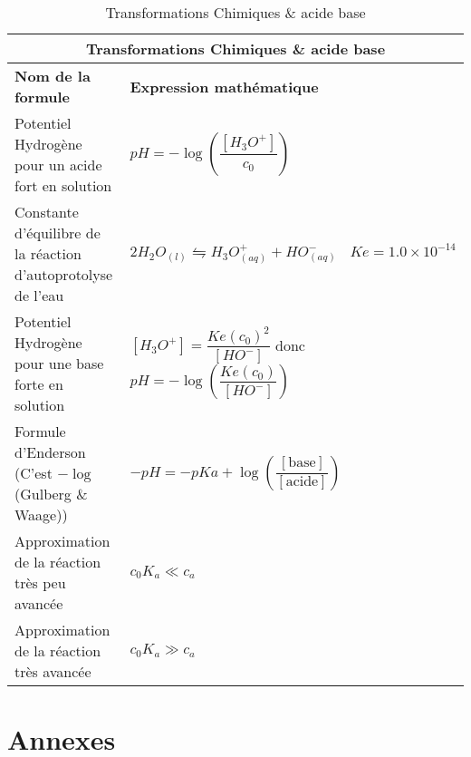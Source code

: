 \documentclass[10pt,a4paper,titlepage,portrait]{article}
\renewcommand{\arraystretch}{2}
\begin{document}
\begin{table}[H]
    \centering
    \renewcommand{\arraystretch}{1.5} %
    \setlength{\tabcolsep}{8pt} %
    \begin{tabular}{@{}p{9cm}p{10cm}@{}}
        \toprule
        \multicolumn{2}{c}{\textbf{Transformations Chimiques \& acide base}} \\
        \midrule
        \textbf{Nom de la formule} & \textbf{Expression mathématique} \\
        \midrule

        Potentiel Hydrogène pour un acide fort en solution & $pH = -\log\left(\dfrac{[H_3O^+]}{c_0}\right)$ \\
        Constante d'équilibre de la réaction d'autoprotolyse de l'eau & $2H_2 O_{(l)} \leftrightharpoons H_3O^+_{(aq)} + HO^-_{(aq)} \ \ \ \ Ke = 1.0\times10^{-14}$ \\
        Potentiel Hydrogène pour une base forte en solution & $[H_3O^+] = \dfrac{Ke(c_0)^2}{[HO^-]}$ donc $pH = -\log\left(\dfrac{Ke(c_0)}{[HO^-]}\right)$ \\
        Formule d'Enderson (C'est $-\log$(Gulberg \& Waage)) & $-pH = -pKa + \log\left(\dfrac{[\text{base}]}{[\text{acide}]}\right)$ \\
        Approximation de la réaction très peu avancée & $c_0K_a \ll c_a$ \\
        Approximation de la réaction très avancée & $c_0K_a \gg c_a$ \\
\bottomrule
\end{tabular}
\caption{Transformations Chimiques \& acide base}
\label{tab:chem}
\end{table}

\section{Annexes}
\end{document}
